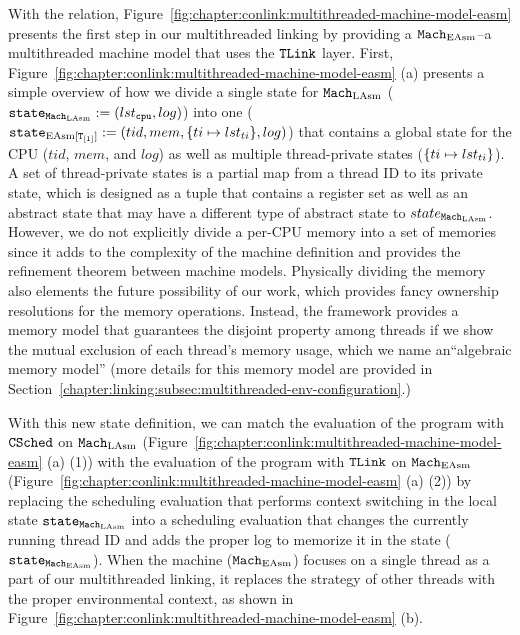 With the relation, 
Figure~\ref{fig:chapter:conlink:multithreaded-machine-model-easm} presents
the first step in our multithreaded linking by providing 
a ${\mathrm{\texttt{Mach}}}_{\mathrm{EAsm}}$--a multithreaded machine model that uses the ${{\mathrm{\texttt{TLink}}}}$ layer.
First,  Figure~\ref{fig:chapter:conlink:multithreaded-machine-model-easm} (a)
presents a simple overview of how we divide a single state for ${\mathrm{\texttt{Mach}}}_{\mathrm{LAsm}}$  (${\mathrm{\texttt{state}}}_{{\mathrm{\texttt{Mach}}}_{\mathrm{LAsm}}} := (lst_{{\mathrm{\texttt{cpu}}}}, log)$)
into one (${\mathrm{\texttt{state}}}_{\mathrm{EAsm}[{{\mathrm{\texttt{T}}}_{[1]}}]} := (tid, mem, \{ti \mapsto lst_{ti}\}, log)$)
that contains a global state for the CPU ($tid$, $mem$, and $log$) as well as 
multiple thread-private states ($\{ti \mapsto lst_{ti}\}$).
A set of thread-private states is 
a partial map from a thread ID to its private state, which is designed as a tuple that contains a register set as well as an abstract state that may have a different type of abstract state to $state_{{\mathrm{\texttt{Mach}}}_{\mathrm{LAsm}}}$. 
However, we do not explicitly divide a per-CPU memory into a set of memories since it adds to the complexity of the machine definition 
and provides the refinement theorem between machine models. 
Physically dividing the memory also elements the future possibility of our work, which provides fancy ownership resolutions for the memory operations. 
Instead, the framework provides a memory model that guarantees the disjoint property among threads if we show the mutual exclusion of each thread’s memory usage, which we name an``algebraic memory model'' (more details for this memory model are provided in Section~\ref{chapter:linking:subsec:multithreaded-env-configuration}.)

With this new state definition, 
we can match the evaluation of the program with  ${{\mathrm{\texttt{CSched}}}}$ on ${\mathrm{\texttt{Mach}}}_{\mathrm{LAsm}}$ (Figure~\ref{fig:chapter:conlink:multithreaded-machine-model-easm} (a) (1)) with  the evaluation of the program with ${{\mathrm{\texttt{TLink}}}}$ on ${\mathrm{\texttt{Mach}}}_{\mathrm{EAsm}}$
(Figure~\ref{fig:chapter:conlink:multithreaded-machine-model-easm} (a) (2)) 
by replacing the scheduling evaluation that performs context switching in the local state ${\mathrm{\texttt{state}}}_{{\mathrm{\texttt{Mach}}}_{\mathrm{LAsm}}}$
into a scheduling evaluation that changes the currently running thread ID and adds the proper log to memorize it in the state
(${\mathrm{\texttt{state}}}_{{\mathrm{\texttt{Mach}}}_{\mathrm{EAsm}}}$).
When the machine (${\mathrm{\texttt{Mach}}}_{\mathrm{EAsm}}$) focuses on a single thread as a part of our multithreaded linking, 
it replaces the strategy of other threads with the proper environmental context, as shown in Figure~\ref{fig:chapter:conlink:multithreaded-machine-model-easm} (b).

